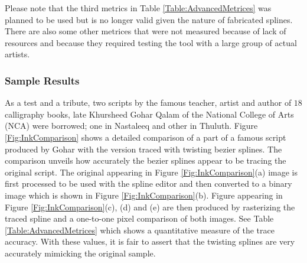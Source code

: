 \begin{table}[ht]
\centering
{}
\caption{Advanced metrices to gauge the effectiveness of twisting bezier splines.}
\label{Table:AdvancedMetrices}
\end{table}

Please note that the third metrics in Table \ref{Table:AdvancedMetrices} was planned to be used but is no longer valid given the nature of fabricated splines.
There are also some other metrices that were not measured because of lack of resources and because they required testing the tool with a large group of actual artists.

\subsubsection{Sample Results}
As a test and a tribute, two scripts by the famous teacher, artist and author of $18$ calligraphy books, late Khursheed Gohar Qalam \cite{bib23} of the National College of Arts (NCA) were borrowed; one in Nastaleeq and other in Thuluth. Figure \ref{Fig:InkComparison} shows a detailed comparison of a part of a famous script produced by Gohar with the version traced with twisting bezier splines. The comparison unveils how accurately the bezier splines appear to be tracing the original script. The original appearing in Figure \ref{Fig:InkComparison}(a) image is first processed to be used with the spline editor and then converted to a binary image which is shown in Figure \ref{Fig:InkComparison}(b). Figure appearing in Figure \ref{Fig:InkComparison}(c), (d) and (e) are then produced by rasterizing the traced spline and a one-to-one pixel comparison of both images. See Table \ref{Table:AdvancedMetrices} which shows a quantitative measure of the trace accuracy. With these values, it is fair to assert that the twisting splines are very accurately mimicking the original sample.

